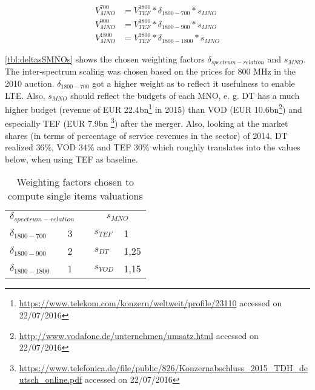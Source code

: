 \begin{subequations}
\label{eq:scalingAll}
\begin{align}
V_{MNO}^{700} &= V_{TEF}^{1800} * \delta_{1800-700} * s_{MNO} \label{eq:oneItemScaling700} \\
V_{MNO}^{900} &= V_{TEF}^{1800} * \delta_{1800-900} * s_{MNO} \label{eq:oneItemScaling900} \\
V_{MNO}^{1800} &= V_{TEF}^{1800} * \delta_{1800-1800} * s_{MNO} \label{eq:oneItemScaling1800}
\end{align}
\end{subequations}

\autoref{tbl:deltasSMNOs} shows the chosen weighting factors $ \delta_{spectrum-relation} $ and  $ s_{MNO} $. The inter-spectrum scaling was chosen based on the prices for 800 MHz in the 2010 auction. $ \delta_{1800-700} $ got a higher weight as to reflect it usefulness to enable LTE. Also, $ s_{MNO} $ should reflect the budgets of each MNO, e. g. DT has a much higher budget (revenue of EUR 22.4bn\footnote{\url{https://www.telekom.com/konzern/weltweit/profile/23110} accessed on 22/07/2016} in 2015) than VOD (EUR 10.6bn\footnote{\url{http://www.vodafone.de/unternehmen/umsatz.html} accessed on 22/07/2016}) and especially TEF (EUR 7.9bn \footnote{\url{https://www.telefonica.de/file/public/826/Konzernabschluss_2015_TDH_deutsch_online.pdf} accessed on 22/07/2016}) after the merger. Also, looking at the market shares (in terms of percentage of service revenues in the sector) of 2014, DT realized $36\%$, VOD $34\%$ and TEF $30\%$ \cite{Bichler2016} which roughly translates into the values below, when using TEF as baseline.

\begin{table}[ht]
\centering
\begin{tabular}{|l|l|l|l|l|}
\cline{1-2} \cline{4-5}
\multicolumn{2}{|c|}{$ \delta_{spectrum-relation} $} &  & \multicolumn{2}{c|}{$ s_{MNO} $} \\ \cline{1-2} \cline{4-5} 
$ \delta_{1800-700} $           & 3          &  & $ s_{TEF} $          & 1             \\ \cline{1-2} \cline{4-5} 
$ \delta_{1800-900} $           & 2          &  & $ s_{DT} $          & 1,25          \\ \cline{1-2} \cline{4-5} 
$ \delta_{1800-1800} $            & 1          &  & $ s_{VOD} $          & 1,15          \\ \cline{1-2} \cline{4-5} 
\end{tabular}
\caption{Weighting factors chosen to compute single items valuations}
\label{tbl:deltasSMNOs}
\end{table}



